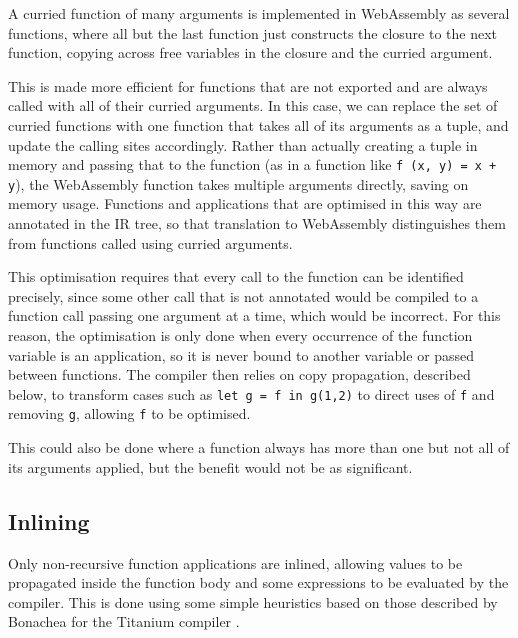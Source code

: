 A curried function of many arguments is implemented in WebAssembly as several functions, where all but the last function just constructs the closure to the next function, copying across free variables in the closure and the curried argument. 

This is made more efficient for functions that are not exported and are always called with all of their curried arguments.  In this case, we can replace the set of curried functions with one function that takes all of its arguments as a tuple, and update the calling sites accordingly. Rather than actually creating a tuple in memory and passing that to the function (as in a function like \verb|f (x, y) = x + y|), the WebAssembly function takes multiple arguments directly, saving on memory usage. Functions and applications that are optimised in this way are annotated in the IR tree, so that translation to WebAssembly distinguishes them from functions called using curried arguments.


This optimisation requires that every call to the function can be identified precisely, since some other call that is not annotated would be compiled to a function call passing one argument at a time, which would be incorrect. For this reason, the optimisation is only done when every occurrence of the function variable is an application, so it is never bound to another variable or passed between functions. The compiler then relies on copy propagation, described below, to transform cases such as  \verb|let g = f in g(1,2)| to direct uses of \verb|f| and removing \verb|g|, allowing \verb|f| to be optimised. 

This could also be done where a function always has more than one but not all of its arguments applied, but the benefit would not be as significant.


\subsection{Inlining}
Only non-recursive function applications are inlined, allowing values to be propagated inside the function body and some expressions to be evaluated by the compiler. This is done using some simple heuristics based on those described by Bonachea for the Titanium compiler \cite{titanium}. 


